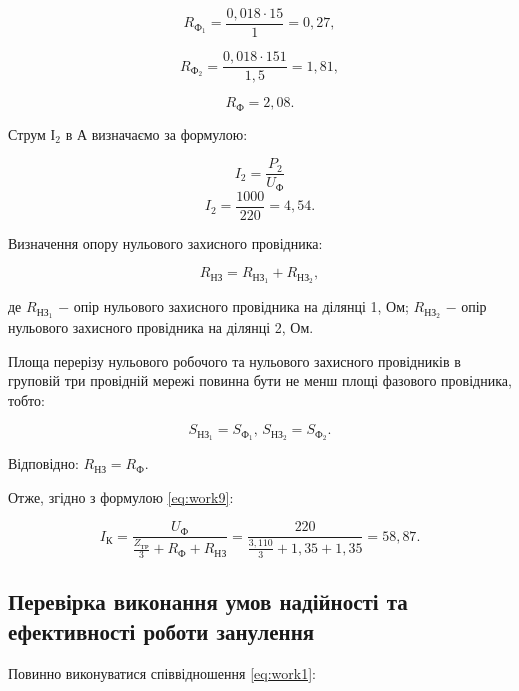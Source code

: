 \[
	R_{\text{Ф}_{1}} = \frac{0,018 \cdot 15}{1} = 0,27,
\]

\[
	R_{\text{Ф}_{2}} = \frac{0,018 \cdot 151}{1,5} = 1,81,
\]

\[
	R_{\text{Ф}} = 2,08.
\]

\vspace{1.5em}

Струм $І_{2}$ в А визначаємо за формулою:

\begin{equation}
	I_{2} = \frac{P_{2}}{U_{\text{Ф}}}
\end{equation}
\[
	I_{2} = \frac{1000}{220} = 4,54.
\]

\vspace{1.5em}

Визначення опору нульового захисного провідника:

\begin{equation}\label{eq:work14}
	R_{\text{НЗ}} = R_{\text{НЗ}_{1}} + R_{\text{НЗ}_{2}},
\end{equation}

\noindent де $R_{\text{НЗ}_{1}}$ $-$ опір нульового захисного провідника на ділянці 1, Ом;\newline
\hspace*{15pt} $R_{\text{НЗ}_{2}}$ $-$ опір нульового захисного провідника на ділянці 2, Ом.

Площа перерізу нульового робочого та нульового захисного провідників в груповій три провідній мережі повинна бути не менш площі фазового провідника, тобто:

\[
	S_{\text{НЗ}_{1}} = S_{\text{Ф}_{1}}, \, S_{\text{НЗ}_{2}} = S_{\text{Ф}_{2}}.
\]

\vspace{1.5em}

Відповідно: $R_{\text{НЗ}} = R_{\text{Ф}}$.

Отже, згідно з формулою \ref{eq:work9}:

\[
	I_{\text{К}} = \frac{U_{\text{Ф}}}{\frac{Z_{\text{ТР}}}{3} + R_{\text{Ф}} + R_{\text{НЗ}}} = \frac{220}{\frac{3,110}{3} + 1,35 + 1,35} = 58,87.
\]

\vspace{1.5em}

\subsection{Перевірка виконання умов надійності та ефективності роботи занулення}

Повинно виконуватися співвідношення \ref{eq:work1}:

